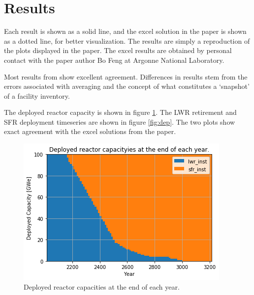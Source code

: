 \section{Results}

Each \Cyclus result is shown as a solid line, and the excel solution in the
paper is shown as a dotted line, for better visualization. The results are
simply a reproduction of the plots displayed in the paper. The excel
results are obtained by personal contact with the paper author
Bo Feng at Argonne National Laboratory.

Most results from \Cyclus show excellent agreement. Differences in results
stem from the errors associated with averaging and the concept of what
constitutes a `snapshot' of a facility inventory.

The deployed reactor capacity is shown in figure \ref{fig:pow_plot}.
The \gls{LWR} retirement and \gls{SFR} deployment timeseries are shown
in figure \ref{fig:dep}. The two plots show exact agreement with the
excel solutions from the paper.

\begin{figure}[htbp!]
	\begin{center}
		\includegraphics[scale=0.6]{./images/results_18/power_plot.png}
	\end{center}
        \caption{Deployed reactor capacities at the end of each year.}
	\label{fig:pow_plot}
\end{figure}



